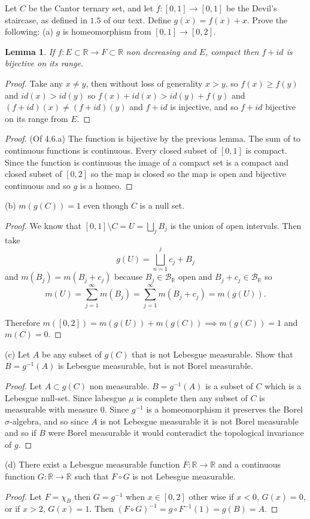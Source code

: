 \documentclass[11pt]{amsart}
\newtheorem{lemma}[theorem]{Lemma}
\theoremstyle{definition}
\numberwithin{theorem}{section}
\numberwithin{definition}{section}
\numberwithin{equation}{section}
\def\reals{{\mathbb R}}
\def\scriptb{{\mathcal B}}
\begin{document}
  \medskip {} Let $C$ be the Cantor ternary set, and let $f: [0,1] \to [0,1]$ be the Devil's staircase, as defined in $1.5$ of our text. Define $g(x) = f(x) + x$. Prove the following:
  (a) $g$ is homeomorphism from $[0,1] \to [0,2]$.
  \begin{lemma}
  	If $f: E \subset\mathbb{R} \to F \subset \mathbb{R}$ non decreasing and $E$, compact then $f +id$ is bijective on its range.
  \end{lemma}
  \begin{proof}
  	Take any $x \neq y$, then without loss of generality $x >y$, so $f(x) \geq f(y)$ and $id(x) > id(y)$ so $f(x) + id(x) > id(y) + f(y)$ and $(f +id)(x) \neq (f+id)(y)$ and $f + id$ is injective, and so $f + id$ bijective on its range from $E$.
  \end{proof}
  \begin{proof} (Of 4.6.a)
  The function is bijective by the previous lemma. The sum of to continuous functions is continuous. Every closed subset of $[0,1]$ is compact. Since the function is continuous the image of a compact set is a compact and closed subset of $[0,2]$ so the map is closed so the map is open and bijective continuous and so $g$ is a homeo.
  \end{proof}

  (b) $m(g(C)) = 1$ even though $C$ is a null set.
  \begin{proof}
  		We know that $[0,1] \setminus C = U =\bigsqcup_j B_j$ is the union of open intervals.  Then take $$g(U) = \bigsqcup_{n=1}^j c_j + B_j$$ and $m(B_j) = m(B_j + c_j)$ because $B_j \in \scriptb_\mathbb{R}$ open and $B_j + c_j \in \scriptb_\mathbb{R}$ so $$m(U) = \sum_{j=1}^\infty m(B_j) = \sum_{j=1}^\infty m(B_j + c_j) = m(g(U)).$$

  		Therefore $m([0,2]) = m(g(U)) + m(g(C)) \implies m(g(C)) = 1$ and $m(C) = 0.$
  \end{proof}
  (c) Let $A$ be any subset of $g(C)$ that is not Lebesgue measurable. Show that $B = g^{-1}(A)$ is Lebesgue measurable, but is not Borel measurable.
  \begin{proof}
  	Let $A \subset g(C)$ non measurable. $B = g^{-1}(A)$ is a subset of $C$ which is a Lebesgue null-set. Since labesgue $\mu$ is complete then any subset of $C$ is measurable with measure $0$. Since $g^{-1}$ is a homeomorphism it preserves the Borel $\sigma$-algebra, and so since $A$ is not Lebesgue measurable it is not Borel measurable and so if $B$ were Borel measurable it would conteradict the topological invariance of $g.$
  \end{proof}
  (d) There exist a Lebesgue measurable function $F: \mathbb{R} \to \mathbb{R}$ and a continuous function $G: \mathbb{R} \to \reals$ such that $F \circ G$ is not Lebesgue measurable. 
  \begin{proof}	
 		Let $F = \chi_B$ then $G = g^{-1}$ when $x \in [0,2]$ other wise if $x <0$, $G(x) = 0$, or if $x>2$, $G(x)=1$. Then $(F \circ G)^{-1}  = g \circ F^{-1}(1) = g(B) =A$.
  \end{proof}
\end{document}
